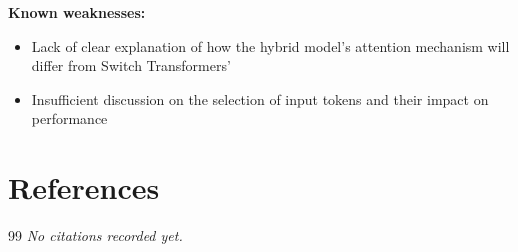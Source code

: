 \documentclass[12pt,a4paper]{article}
\begin{document}
\textbf{Known weaknesses:}
\begin{itemize}
  \item Lack of clear explanation of how the hybrid model's attention mechanism will differ from Switch Transformers'
  \item Insufficient discussion on the selection of input tokens and their impact on performance
\end{itemize}


\section{References}

\begin{thebibliography}{99}
\textit{No citations recorded yet.}
\end{thebibliography}
\end{document}
